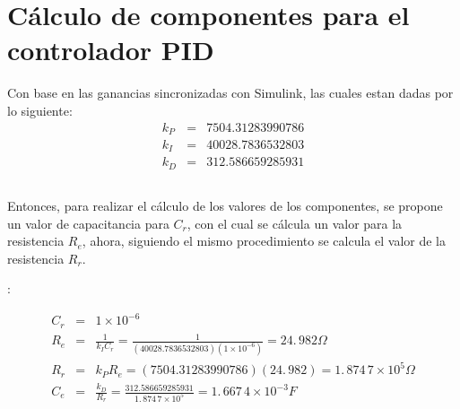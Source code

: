 \documentclass[letterpaper,11pt]{article}
\begin{document}
\section{C\'{a}lculo de componentes para el controlador PID}

Con base en las ganancias sincronizadas con Simulink, las cuales estan dadas
por lo siguiente:%
\begin{eqnarray*}
k_{P} &=&7504.31283990786 \\
k_{I} &=&40028.7836532803 \\
k_{D} &=&312.586659285931
\end{eqnarray*}

$\,$

Entonces, para realizar el c\'{a}lculo de los valores de los componentes, se
propone un valor de capacitancia para $C_{r}$, con el cual se c\'{a}lcula un
valor para la resistencia $R_{e}$, ahora, siguiendo el mismo procedimiento
se calcula el valor de la resistencia $R_{r}$.

:

\begin{eqnarray*}
C_{r} &=&1\times 10^{-6} \\
R_{e} &=&\frac{1}{k_{I}C_{r}}=\frac{1}{\left( 40028.7836532803\right) \left(
1\times 10^{-6}\right) }=24.\,\allowbreak 982\Omega \\
R_{r} &=&k_{P}R_{e}=\left( 7504.31283990786\right) \left( 24.\,\allowbreak
982\right) =1.\,\allowbreak 874\,7\times 10^{5}\Omega \\
C_{e} &=&\frac{k_{D}}{R_{r}}=\frac{312.586659285931}{1.\,\allowbreak
874\,7\times 10^{5}}=1.\,\allowbreak 667\,4\times 10^{-3}F
\end{eqnarray*}
\end{document}
